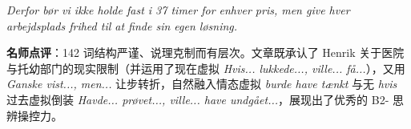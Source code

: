 \begin{answerbox}
\textit{Derfor bør vi ikke holde fast i 37 timer for enhver pris, men give hver arbejdsplads frihed til at finde sin egen løsning.}

\small\textbf{名师点评}：142 词结构严谨、说理克制而有层次。文章既承认了 Henrik 关于医院与托幼部门的现实限制（并运用了现在虚拟 \textit{Hvis... lukkede..., ville... få...}），又用 \textit{Ganske vist..., men...} 让步转折，自然融入情态虚拟 \textit{burde have tænkt} 与无 \textit{hvis} 过去虚拟倒装 \textit{Havde... prøvet..., ville... have undgået...}，展现出了优秀的 B2- 思辨操控力。
\end{answerbox}